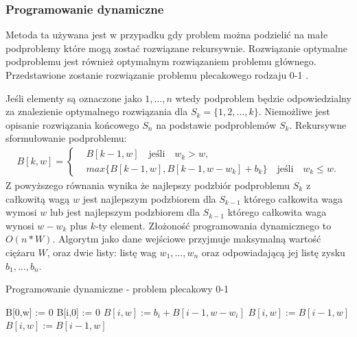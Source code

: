 \subsubsection{Programowanie dynamiczne}
Metoda ta używana jest w przypadku gdy problem można podzielić na małe podproblemy które mogą zostać rozwiązane rekursywnie. Rozwiązanie optymalne podproblemu jest również optymalnym rozwiązaniem problemu głównego. Przedstawione zostanie rozwiązanie problemu plecakowego rodzaju 0-1 \cite{GoddardLecture}.

Jeśli elementy są oznaczone jako $1,\dots,n$ wtedy podproblem będzie odpowiedzialny za znalezienie optymalnego rozwiązania dla $S_k = \{1,2,\dots,k \}$. Niemożliwe jest opisanie rozwiązania końcowego $S_n$ na podstawie podproblemów $S_k$. Rekursywne sformułowanie podproblemu:
\begin{equation}\label{recursiveDynamic}
  \begin{aligned}
    B[k,w] =
    \begin{cases}
    & B[k-1,w] \quad \textrm{jeśli} \quad w_k > w, \\
    & max\{B[k-1,w], B[k-1,w-w_k] + b_k\} \quad \textrm{jeśli} \quad  w_k \le w.
    \end{cases}
  \end{aligned}
\end{equation}
Z powyższego równania wynika że najlepszy podzbiór podproblemu $S_k$ z całkowitą wagą $w$ jest najlepszym podzbiorem dla $S_{k-1}$ którego całkowita waga wymosi $w$ lub jest najlepszym podzbiorem dla $S_{k-1}$ którego całkowita waga wynosi $w-w_k$ plus $k$-ty element. Złożoność programowania dynamicznego to $O(n*W)$. Algorytm jako dane wejściowe przyjmuje maksymalną wartość ciężaru $W$, oraz dwie listy: listę wag $w_1,\dots,w_n$ oraz odpowiadającą jej listę zysku $b_1,\dots,b_n$.
\begin{algorithm}
  \caption{Programowanie dynamiczne - problem plecakowy 0-1}
  \begin{algorithmic}[1]
      \State B[0,w] := 0
    \EndFor
      \State B[i,0] := 0
    \EndFor
            \State $B[i,w] := b_i + B[i-1,w-w_i]$
          \Else
            \State $B[i,w] := B[i-1,w]$
          \EndIf
        \Else
          \State $B[i,w] := B[i-1,w]$
        \EndIf
      \EndFor
    \EndFor
  \end{algorithmic}
\end{algorithm}
